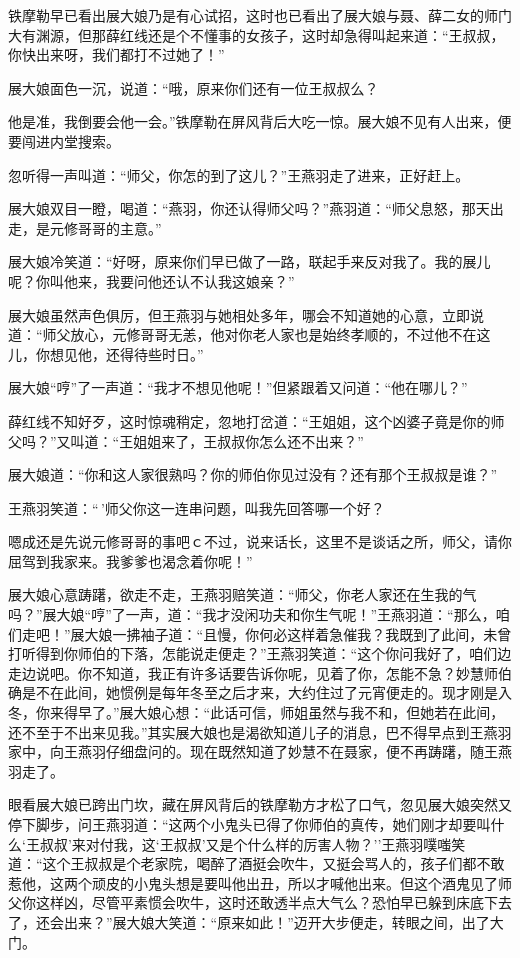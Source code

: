 \documentclass[12pt,oneside]{book}
\begin{document}
铁摩勒早已看出展大娘乃是有心试招，这时也已看出了展大娘与聂、薛二女的师门大有渊源，但那薛红线还是个不懂事的女孩子，这时却急得叫起来道：``王叔叔，你快出来呀，我们都打不过她了！''

展大娘面色一沉，说道：``哦，原来你们还有一位王叔叔么？

他是准，我倒要会他一会。''铁摩勒在屏风背后大吃一惊。展大娘不见有人出来，便要闯进内堂搜索。

忽听得一声叫道：``师父，你怎的到了这儿？''王燕羽走了进来，正好赶上。

展大娘双目一瞪，喝道：``燕羽，你还认得师父吗？''燕羽道：``师父息怒，那天出走，是元修哥哥的主意。''

展大娘冷笑道：``好呀，原来你们早已做了一路，联起手来反对我了。我的展儿呢？你叫他来，我要问他还认不认我这娘亲？''

展大娘虽然声色俱厉，但王燕羽与她相处多年，哪会不知道她的心意，立即说道：``师父放心，元修哥哥无恙，他对你老人家也是始终孝顺的，不过他不在这儿，你想见他，还得待些时日。''

展大娘``哼''了一声道：``我才不想见他呢！''但紧跟着又问道：``他在哪儿？''

薛红线不知好歹，这时惊魂稍定，忽地打岔道：``王姐姐，这个凶婆子竟是你的师父吗？''又叫道：``王姐姐来了，王叔叔你怎么还不出来？''

展大娘道：``你和这人家很熟吗？你的师伯你见过没有？还有那个王叔叔是谁？''

王燕羽笑道：``\,'师父你这一连串问题，叫我先回答哪一个好？

嗯成还是先说元修哥哥的事吧ｃ不过，说来话长，这里不是谈话之所，师父，请你屈驾到我家来。我爹爹也渴念着你呢！''

展大娘心意踌躇，欲走不走，王燕羽赔笑道：``师父，你老人家还在生我的气吗？''展大娘``哼''了一声，道：``我才没闲功夫和你生气呢！''王燕羽道：``那么，咱们走吧！''展大娘一拂袖子道：``且慢，你何必这样着急催我？我既到了此间，未曾打听得到你师伯的下落，怎能说走便走？''王燕羽笑道：``这个你问我好了，咱们边走边说吧。你不知道，我正有许多话要告诉你呢，见着了你，怎能不急？妙慧师伯确是不在此间，她惯例是每年冬至之后才来，大约住过了元宵便走的。现才刚是入冬，你来得早了。''展大娘心想：``此话可信，师姐虽然与我不和，但她若在此间，还不至于不出来见我。''其实展大娘也是渴欲知道儿子的消息，巴不得早点到王燕羽家中，向王燕羽仔细盘问的。现在既然知道了妙慧不在聂家，便不再踌躇，随王燕羽走了。

眼看展大娘已跨出门坎，藏在屏风背后的铁摩勒方才松了口气，忽见展大娘突然又停下脚步，问王燕羽道：``这两个小鬼头已得了你师伯的真传，她们刚才却要叫什么`王叔叔'来对付我，这`王叔叔'又是个什么样的厉害人物？''王燕羽噗嗤笑道：``这个王叔叔是个老家院，喝醉了酒挺会吹牛，又挺会骂人的，孩子们都不敢惹他，这两个顽皮的小鬼头想是要叫他出丑，所以才喊他出来。但这个酒鬼见了师父你这样凶，尽管平素惯会吹牛，这时还敢透半点大气么？恐怕早已躲到床底下去了，还会出来？''展大娘大笑道：``原来如此！''迈开大步便走，转眼之间，出了大门。
\end{document}
